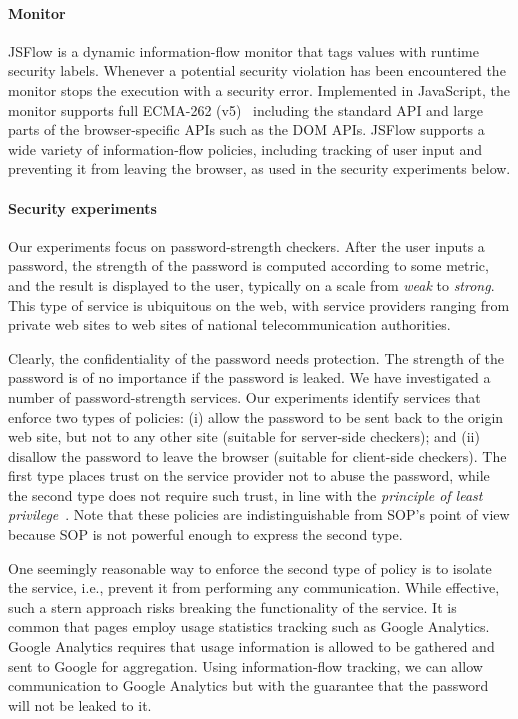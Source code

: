 \documentclass{llncs}
\begin{document}
\vspace{-.4cm}
\paragraph{Monitor}

JSFlow is a dynamic information-flow monitor that tags values with runtime
security labels. Whenever a potential security
violation has been encountered the monitor stops the execution with a security
error. Implemented in JavaScript, the monitor supports
full 
ECMA-262 (v5)~\cite{ecma:262:5} including the standard API and large parts of the
browser-specific APIs such as the DOM APIs. 
JSFlow supports a wide variety of information-flow policies,
including tracking of user input and preventing it from leaving the
browser, as used in
the security experiments below.

\vspace{-.4cm}
\paragraph{Security experiments}
Our experiments focus on password-strength checkers. 
After the user inputs a password, the strength of the password is computed according
to some metric, and the result is displayed to the user, typically on a scale
from \emph{weak} to \emph{strong}. This type of service is ubiquitous
on the web, with service providers ranging from private web sites to web sites
of national telecommunication authorities.

Clearly, the confidentiality of the password needs protection.  The
strength of the password is of no importance if the password is leaked.  We
have investigated a number of password-strength services. 
Our experiments identify services that enforce two types of policies: (i)
allow the password to be sent back to the origin web site, but not to
any other site (suitable for server-side checkers); and (ii) disallow the password
to leave the browser (suitable for client-side checkers). 
The first type places trust on the service provider not to
abuse the password, while the second type does not require such trust,
in line with the \emph{principle of least
privilege}~\cite{Saltzer:Schroeder:TCB}.
Note that these policies are indistinguishable from SOP's point of
view because SOP is not powerful enough to express the second type.

One seemingly reasonable way to enforce the second type of policy is to
isolate the service, i.e., prevent it from performing any communication.
While effective, such a stern approach risks breaking the functionality of the service.
It is common that pages employ usage statistics tracking such as Google
Analytics. Google Analytics requires that usage information is allowed to be gathered and
sent to Google for aggregation. Using information-flow tracking, we
can allow communication to Google Analytics but with the guarantee
that the password will not be leaked to it.
\end{document}
